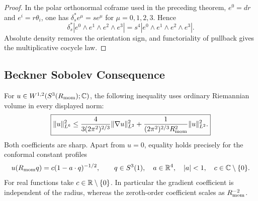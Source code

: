 \documentclass[11pt]{article}
\begin{document}
\begin{proof}
In the polar orthonormal coframe used in the preceding theorem,
\(e^0=dr\) and \(e^i=r\theta_i\), one has
\(\delta_s^*e^\mu=se^\mu\) for \(\mu=0,1,2,3\).  Hence
\[
 \delta_s^*|e^0\wedge e^1\wedge e^2\wedge e^3|
 =s^4|e^0\wedge e^1\wedge e^2\wedge e^3|.
\]
Absolute density removes the orientation sign, and functoriality of pullback
gives the multiplicative cocycle law.
\end{proof}


\subsection{Beckner Sobolev Consequence}
\label{p1:subsec:sobolev-proof}

\begin{theorem}
\label{p1:thm:beckner-sobolev-s3}
\leavevmode\par
For \(u\in W^{1,2}(S^3(R_{\mathrm{mom}});\mathbb{C})\), the following inequality
uses ordinary Riemannian volume in every displayed norm:
\[
 \boxed{
 \|u\|_{L^6}^2
 \le
 \frac{4}{3(2\pi^2)^{2/3}}\|\nabla u\|_{L^2}^2
 +\frac{1}{(2\pi^2)^{2/3}R_{\mathrm{mom}}^2}\|u\|_{L^2}^2.}
\]
Both coefficients are sharp.  Apart from \(u=0\), equality holds precisely
for the conformal constant profiles
\[
 u(R_{\mathrm{mom}} q)=c(1-a\cdot q)^{-1/2},
 \qquad q\in S^3(1),\quad a\in\mathbb{R}^4,\quad |a|<1,
 \quad c\in\mathbb{C}\setminus\{0\}.
\]
For real functions take \(c\in\mathbb{R}\setminus\{0\}\).  In particular the
gradient coefficient is independent of the radius, whereas the zeroth-order
coefficient scales as \(R_{\mathrm{mom}}^{-2}\).
\end{theorem}
\end{document}
